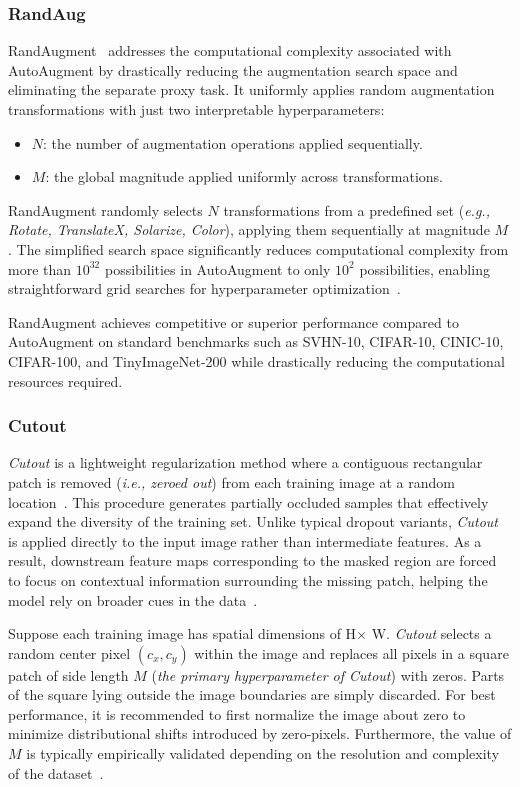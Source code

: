 \subsubsection{RandAug}
RandAugment~\cite{cubuk2019randaugment} addresses the computational complexity associated with AutoAugment by drastically reducing the augmentation search space and eliminating the separate proxy task. It uniformly applies random augmentation transformations with just two interpretable hyperparameters:
\begin{itemize}
    \item $N$: the number of augmentation operations applied sequentially.
    \item $M$: the global magnitude applied uniformly across transformations.
\end{itemize}

RandAugment randomly selects $N$ transformations from a predefined set (\textit{e.g., Rotate, TranslateX, Solarize, Color}), applying them sequentially at magnitude $M$. The simplified search space significantly reduces computational complexity from more than $10^{32}$ possibilities in AutoAugment to only $10^2$ possibilities, enabling straightforward grid searches for hyperparameter optimization~\cite{cubuk2019randaugment}.

RandAugment achieves competitive or superior performance compared to AutoAugment on standard benchmarks such as SVHN-10, CIFAR-10, CINIC-10, CIFAR-100, and TinyImageNet-200 while drastically reducing the computational resources required.

\subsubsection{Cutout}
\label{subsec:cutout}
\textit{Cutout} is a lightweight regularization method where a contiguous rectangular patch is removed (\textit{i.e., zeroed out}) from each training image at a random location~\cite{devries2017cutout}. This procedure generates partially occluded samples that effectively expand the diversity of the training set. Unlike typical dropout variants, \textit{Cutout} is applied directly to the input image rather than intermediate features. As a result, downstream feature maps corresponding to the masked region are forced to focus on contextual information surrounding the missing patch, helping the model rely on broader cues in the data~\cite{devries2017cutout}.

Suppose each training image has spatial dimensions of H$\times$ W. \textit{Cutout} selects a random center pixel \((c_x, c_y)\) within the image and replaces all pixels in a square patch of side length \(M\) (\textit{the primary hyperparameter of Cutout}) with zeros. Parts of the square lying outside the image boundaries are simply discarded. For best performance, it is recommended to first normalize the image about zero to minimize distributional shifts introduced by zero-pixels. Furthermore, the value of \(M\) is typically empirically validated depending on the resolution and complexity of the dataset~\cite{devries2017cutout}.

